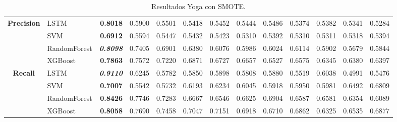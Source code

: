 \begin{table}[H]
\begin{adjustbox}{max width=14cm}
\begin{tabular}{|c|l|r|r|r|r|r|r|r|r|r|r|r|}
			\hline
			\textbf{Precision} &  LSTM & \textbf{  0.8018 } &  0.5900 &  0.5501 &  0.5418 &  0.5452 &  0.5444 &  0.5486 &  0.5374 &  0.5382 &  0.5341 &  0.5284 \\
			&  SVM & \textbf{  0.6912 } &  0.5594 &  0.5447 &  0.5432 &  0.5423 &  0.5310 &  0.5392 &  0.5310 &  0.5311 &  0.5318 &  0.5394 \\
			&  RandomForest & \textit{ \textbf{  0.8098 } } &  0.7405 &  0.6901 &  0.6380 &  0.6076 &  0.5986 &  0.6024 &  0.6114 &  0.5902 &  0.5679 &  0.5844 \\
			&  XGBoost & \textbf{  0.7863 } &  0.7572 &  0.7220 &  0.6871 &  0.6727 &  0.6657 &  0.6527 &  0.6575 &  0.6345 &  0.6380 &  0.6397 \\
			\hline
			\textbf{Recall} &  LSTM & \textit{ \textbf{  0.9110 } } &  0.6245 &  0.5782 &  0.5850 &  0.5898 &  0.5808 &  0.5880 &  0.5519 &  0.6038 &  0.4991 &  0.5476 \\
			&  SVM & \textbf{  0.7007 } &  0.5542 &  0.5732 &  0.6193 &  0.6234 &  0.6045 &  0.5918 &  0.5950 &  0.5981 &  0.6492 &  0.6809 \\
			&  RandomForest & \textbf{  0.8426 } &  0.7746 &  0.7283 &  0.6667 &  0.6546 &  0.6625 &  0.6904 &  0.6587 &  0.6581 &  0.6354 &  0.6089 \\
			&  XGBoost & \textbf{  0.8058 } &  0.7690 &  0.7458 &  0.7047 &  0.7151 &  0.6918 &  0.6710 &  0.6862 &  0.6325 &  0.6535 &  0.6877 \\
			\hline
		\end{tabular}
	\end{adjustbox}
	\caption{Resultados Yoga con SMOTE.}
	\label{tab:Yoga_SMOTE}
\end{table}
